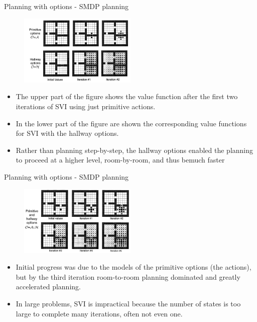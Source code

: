 \begin{frame}{Planning with options - SMDP planning}
    \begin{figure}
        \centering
        \includegraphics[width=0.5\textwidth]{img/planningOptionsInitG1.png}
        \label{figPlanningOptionsInitG1}
    \end{figure}
    \begin{itemize}
        \item The upper part of the figure shows the value function after the first two iterations of SVI using just primitive actions.
        \item In the lower part of the figure are shown the corresponding value functions for SVI with the hallway options.
        \item Rather than planning step-by-step, the hallway options enabled the planning to proceed at a higher level, room-by-room, and thus bemuch faster
    \end{itemize}
\end{frame}

\begin{frame}{Planning with options - SMDP planning}
    \begin{figure}
        \centering
        \includegraphics[width=0.5\textwidth]{img/planningOptionsInitG2.png}
        \label{figPlanningOptionsInitG1}
    \end{figure}
    \begin{itemize}
        \item Initial progress was due to the models of the primitive options (the actions), but by the third iteration room-to-room planning dominated and greatly accelerated planning.
        \item In large problems, SVI is impractical because the number of states is too large to complete many iterations, often not even one.
    \end{itemize}
\end{frame}

















